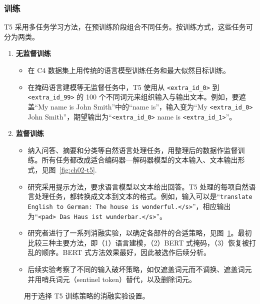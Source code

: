 \subsubsection{训练}
T5 采用多任务学习方法，在预训练阶段组合不同任务。按训练方式，这些任务可分为两类。
\begin{enumerate}
\item \textbf{无监督训练}
  \begin{itemize}
  \item 在 C4 数据集上用传统的语言模型训练任务和最大似然目标训练。
  \item 在掩码语言建模等无监督任务中，T5 使用从 \texttt{<extra\_id\_0>} 到 \texttt{<extra\_id\_99>} 的 100 个不同词元来组织输入与输出文本。例如，要遮盖“My name is John Smith”中的“name is”，输入变为“My \texttt{<extra\_id\_0>} John Smith”，期望输出为“\texttt{<extra\_id\_0>} name is \texttt{<extra\_id\_1>}”。
  \end{itemize}
\item \textbf{监督训练}
  \begin{itemize}
  \item 纳入问答、摘要和分类等自然语言处理任务，用整理后的数据作监督训练。所有任务都改成适合编码器—解码器模型的文本输入、文本输出形式，见图~\ref{fig:ch02-t5}.
  \item 研究采用提示方法，要求语言模型以文本给出回答。T5 处理的每项自然语言处理任务，都转换成文本到文本的格式。例如，输入可以是“\texttt{translate English to German: The house is wonderful.</s>}”，相应输出为“\texttt{<pad> Das Haus ist wunderbar.</s>}”。
  \item 研究者进行了一系列消融实验，以确定各部件的合适策略，见图~\ref{fig:ch02-t5-ablation}。最初比较三种主要方法，即（1）语言建模，（2）BERT 式掩码，（3）恢复被打乱的顺序。BERT 式方法效果最好，因此被选作后续分析。
  \item 后续实验考察了不同的输入破坏策略，如仅遮盖词元而不调换、遮盖词元并用哨兵词元（sentinel token）替代，以及删除词元。
  \end{itemize}
\end{enumerate}


\begin{figure}[!htbp]
\centering

\caption{用于选择 T5 训练策略的消融实验设置。}
\label{fig:ch02-t5-ablation}
\end{figure}

